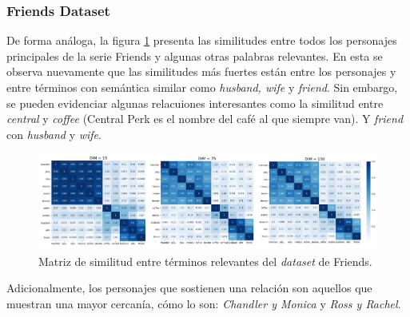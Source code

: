 \subsubsection{Friends Dataset}

De forma análoga, la figura \ref{fig:friends_sim_matrix} presenta las similitudes entre todos los personajes principales de la serie Friends y algunas otras palabras relevantes. En esta se observa nuevamente que las similitudes más fuertes están entre los personajes y entre términos con semántica similar como \textit{husband, wife} y \textit{friend}. Sin embargo, se pueden evidenciar algunas relacuiones interesantes como la similitud  entre \textit{central} y \textit{coffee} (Central Perk es el nombre del café al que siempre van). Y \textit{friend} con \textit{husband} y \textit{wife}. \\

\begin{figure}[H]
    \centering
    \includegraphics[width=\textwidth]{doc/images/friends_sim_matrix.png}
    \caption{Matriz de similitud entre términos relevantes del \textit{dataset} de Friends.}
    \label{fig:friends_sim_matrix}
\end{figure}

Adicionalmente, los personajes que sostienen una relación son aquellos que muestran una mayor cercanía, cómo lo son: \textit{Chandler y Monica} y \textit{Ross y Rachel}. 

\newpage